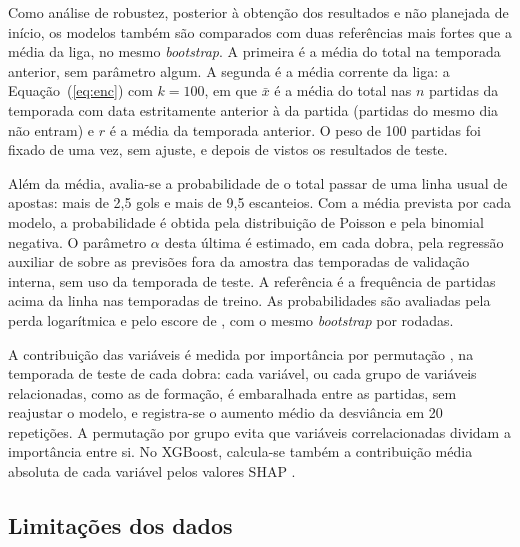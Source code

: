 Como análise de robustez, posterior à obtenção dos resultados e não planejada de início, os modelos também são comparados com duas referências mais fortes que a média da liga, no mesmo \textit{bootstrap}. A primeira é a média do total na temporada anterior, sem parâmetro algum. A segunda é a média corrente da liga: a Equação~(\ref{eq:enc}) com $k = 100$, em que $\bar{x}$ é a média do total nas $n$ partidas da temporada com data estritamente anterior à da partida (partidas do mesmo dia não entram) e $r$ é a média da temporada anterior. O peso de 100 partidas foi fixado de uma vez, sem ajuste, e depois de vistos os resultados de teste.

Além da média, avalia-se a probabilidade de o total passar de uma linha usual de apostas: mais de 2,5 gols e mais de 9,5 escanteios. Com a média prevista por cada modelo, a probabilidade é obtida pela distribuição de Poisson e pela binomial negativa. O parâmetro $\alpha$ desta última é estimado, em cada dobra, pela regressão auxiliar de  sobre as previsões fora da amostra das temporadas de validação interna, sem uso da temporada de teste. A referência é a frequência de partidas acima da linha nas temporadas de treino. As probabilidades são avaliadas pela perda logarítmica e pelo escore de , com o mesmo \textit{bootstrap} por rodadas.

A contribuição das variáveis é medida por importância por permutação \cite{breiman2001}, na temporada de teste de cada dobra: cada variável, ou cada grupo de variáveis relacionadas, como as de formação, é embaralhada entre as partidas, sem reajustar o modelo, e registra-se o aumento médio da desviância em 20 repetições. A permutação por grupo evita que variáveis correlacionadas dividam a importância entre si. No XGBoost, calcula-se também a contribuição média absoluta de cada variável pelos valores SHAP \cite{lundbergLee2017}.

\subsection{Limitações dos dados}\label{subsec:Limitacoes}


